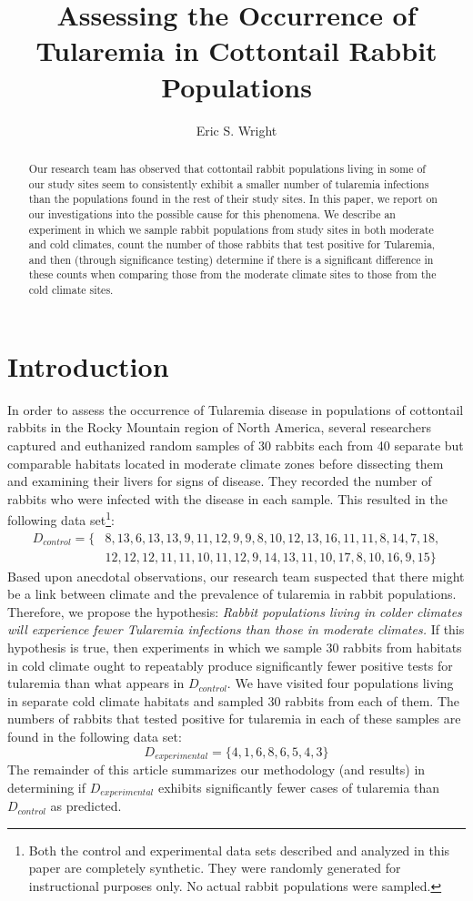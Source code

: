\documentclass{amsart}
\title{Assessing the Occurrence of Tularemia in Cottontail Rabbit Populations}
\author{Eric S. Wright}
\begin{document}
\begin{abstract}
Our research team has observed that cottontail rabbit populations living in some of our study sites seem to consistently exhibit a smaller number of tularemia infections than the populations found in the rest of their study sites.  In this paper, we report on our investigations into the possible cause for this phenomena. We describe an experiment in which we sample rabbit populations from study sites in both moderate and cold climates, count the number of those rabbits that test positive for Tularemia, and then (through significance testing) determine if there is a significant difference in these counts when comparing those from the moderate climate sites to those from the cold climate sites.
\end{abstract}
\maketitle
\section{Introduction}\label{S:Introduction}
In order to assess the occurrence of Tularemia disease in populations of cottontail rabbits in the Rocky Mountain region of North America, several researchers captured and euthanized random samples of 30 rabbits each from 40 separate but comparable habitats located in moderate climate zones before dissecting them and examining their livers for signs of disease. They recorded the number of rabbits who were infected with the disease in each sample. This resulted in the following data set\footnote{Both the control and experimental data sets described and analyzed in this paper are completely synthetic. They were randomly generated for instructional purposes only. No actual rabbit populations were sampled.}:
\begin{align*}
D_{control}=\{&8, 13, 6, 13, 13, 9, 11, 12, 9, 9, 8, 10, 12, 13, 16, 11, 11, 8, 14, 7, 18,\\ & 12, 12, 12, 11, 11, 10, 11, 12, 9, 14, 13, 11, 10, 17, 8, 10, 16, 9, 15\}
\end{align*}
Based upon anecdotal observations, our research team suspected that there might be a link between climate and the prevalence of tularemia in rabbit populations.  Therefore, we propose the hypothesis: \textsl{Rabbit populations living in colder climates will experience fewer Tularemia infections than those in moderate climates.} If this hypothesis is true, then experiments in which we sample 30 rabbits from habitats in cold climate ought to repeatably produce significantly fewer positive tests for tularemia than what appears in $D_{control}$. We have visited four populations living in separate cold climate habitats and sampled 30 rabbits from each of them.  The numbers of rabbits that tested positive for tularemia in each of these samples are found in the following data set:
\[D_{experimental}=\{4, 1, 6, 8, 6, 5, 4, 3\}\]
The remainder of this article summarizes our methodology (and results) in determining if $D_{experimental}$ exhibits significantly fewer cases of tularemia than $D_{control}$ as predicted.
\end{document}

